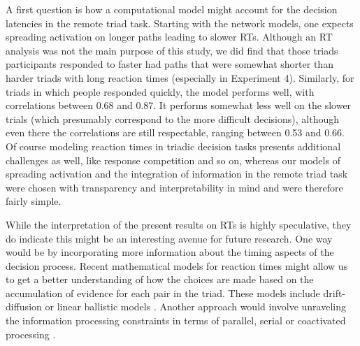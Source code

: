 \documentclass[doc]{apa6}
\begin{document}
A first question is how a computational model might account for the decision latencies in the remote triad task. Starting with the \textcite{Collins1975} network models, one expects spreading activation on longer paths leading to slower RTs. Although an RT analysis was not the main purpose of this study, we did find that those triads participants responded to faster had paths that were somewhat shorter than harder triads with long reaction times (especially in Experiment 4). Similarly, for triads in which people responded quickly, the model performs well, with correlations between 0.68 and 0.87. It performs somewhat less well on the slower trials (which presumably correspond to the more difficult decisions), although even there the correlations are still respectable, ranging between 0.53 and 0.66.
Of course modeling reaction times in triadic decision tasks presents additional challenges as well, like response competition and so on, whereas our models of spreading activation and the integration of information in the remote triad task were chosen with transparency and interpretability in mind and were therefore fairly simple.

While the interpretation of the present results on RTs is highly speculative, they do indicate this might be an interesting avenue for future research. One way would be by incorporating more information about the timing aspects of the decision process. Recent mathematical models for reaction times might allow us to get a better understanding of how the choices are made based on the accumulation of evidence for each pair in the triad. These models include drift-diffusion \parencite{Ratcliff1978} or linear ballistic models \parencite{BrownHeathcote2008}. Another approach would involve unraveling the information processing constraints in terms of  parallel, serial or coactivated processing \parencite{TownsendNozawa1995}.
\end{document}
